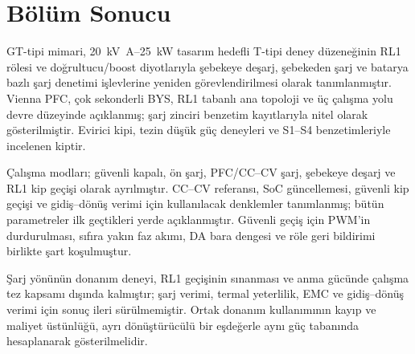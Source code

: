 \section{Bölüm Sonucu}

GT-tipi mimari, \SI{20}{\kilo\volt\ampere}--\SI{25}{\kilo\watt} tasarım hedefli T-tipi deney düzeneğinin RL1 rölesi ve doğrultucu/boost diyotlarıyla şebekeye deşarj, şebekeden şarj ve batarya bazlı şarj denetimi işlevlerine yeniden görevlendirilmesi olarak tanımlanmıştır. Vienna PFC, çok sekonderli BYS, RL1 tabanlı ana topoloji ve üç çalışma yolu devre düzeyinde açıklanmış; şarj zinciri benzetim kayıtlarıyla nitel olarak gösterilmiştir. Evirici kipi, tezin düşük güç deneyleri ve S1--S4 benzetimleriyle incelenen kiptir.

Çalışma modları; güvenli kapalı, ön şarj, PFC/CC--CV şarj, şebekeye deşarj ve RL1 kip geçişi olarak ayrılmıştır. CC--CV referansı, SoC güncellemesi, güvenli kip geçişi ve gidiş--dönüş verimi için kullanılacak denklemler tanımlanmış; bütün parametreler ilk geçtikleri yerde açıklanmıştır. Güvenli geçiş için PWM'in durdurulması, sıfıra yakın faz akımı, DA bara dengesi ve röle geri bildirimi birlikte şart koşulmuştur.

Şarj yönünün donanım deneyi, RL1 geçişinin sınanması ve anma gücünde çalışma tez kapsamı dışında kalmıştır; şarj verimi, termal yeterlilik, EMC ve gidiş--dönüş verimi için sonuç ileri sürülmemiştir. Ortak donanım kullanımının kayıp ve maliyet üstünlüğü, ayrı dönüştürücülü bir eşdeğerle aynı güç tabanında hesaplanarak gösterilmelidir.

